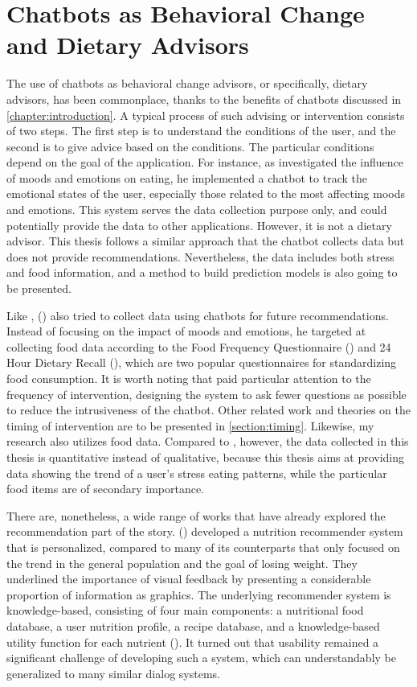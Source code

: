 \section{Chatbots as Behavioral Change and Dietary Advisors}
The use of chatbots as behavioral change advisors, or specifically, dietary advisors, has been commonplace, thanks to the benefits of chatbots discussed in \autoref{chapter:introduction}. A typical process of such advising or intervention consists of two steps. The first step is to understand the conditions of the user, and the second is to give advice based on the conditions. The particular conditions depend on the goal of the application. For instance, as \citeauthor{16_martin} investigated the influence of moods and emotions on eating, he implemented a chatbot to track the emotional states of the user, especially those related to the most affecting moods and emotions. This system serves the data collection purpose only, and could potentially provide the data to other applications. However, it is not a dietary advisor. This thesis follows a similar approach that the chatbot collects data but does not provide recommendations. Nevertheless, the data includes both stress and food information, and a method to build prediction models is also going to be presented. \bigskip

\noindent Like \citeauthor{16_martin}, \citeauthor{17_ludwig} (\citeyear{17_ludwig}) also tried to collect data using chatbots for future recommendations. Instead of focusing on the impact of moods and emotions, he targeted at collecting food data according to the Food Frequency Questionnaire (\cite{49_ffq}) and 24 Hour Dietary Recall (\cite{50_24hr}), which are two popular questionnaires for standardizing food consumption. It is worth noting that \citeauthor{17_ludwig} paid particular attention to the frequency of intervention, designing the system to ask fewer questions as possible to reduce the intrusiveness of the chatbot. Other related work and theories on the timing of intervention are to be presented in \autoref{section:timing}. Likewise, my research also utilizes food data. Compared to \citeauthor{17_ludwig}, however, the data collected in this thesis is quantitative instead of qualitative, because this thesis aims at providing data showing the trend of a user's stress eating patterns, while the particular food items are of secondary importance.\bigskip

\noindent There are, nonetheless, a wide range of works that have already explored the recommendation part of the story. \citeauthor{18_nutrilize} (\citeyear{18_nutrilize}) developed a nutrition recommender system that is personalized, compared to many of its counterparts that only focused on the trend in the general population and the goal of losing weight. They underlined the importance of visual feedback by presenting a considerable proportion of information as graphics. The underlying recommender system is knowledge-based, consisting of four main components: a nutritional food database, a user nutrition profile, a recipe database, and a knowledge-based utility function for each nutrient (\cite{18_nutrilize}). It turned out that usability remained a significant challenge of developing such a system, which can understandably be generalized to many similar dialog systems.

